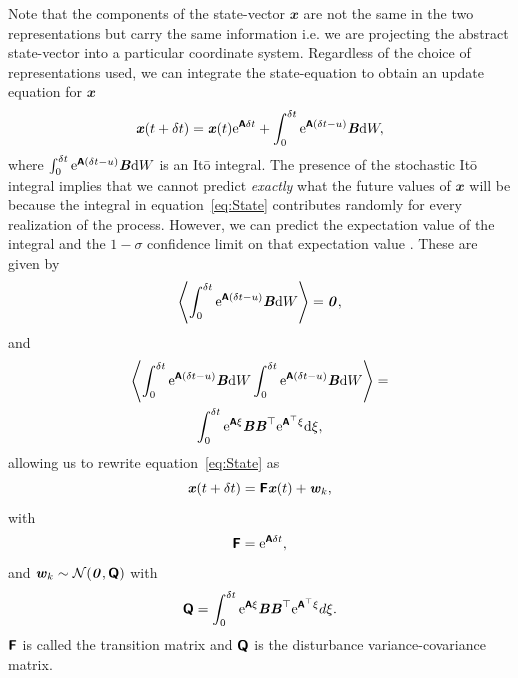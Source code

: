 \documentclass[a4paper,fleqn,usenatbib]{mnras}
\begin{document}
Note that the components of the state-vector $\mathbfit{x}$ are not the same in the two representations but carry the same information i.e. we are projecting the abstract state-vector into a particular coordinate system. Regardless of the choice of representations used, we can integrate the state-equation \citep{DimensionEstimationBrockwell,Oksendal} to obtain an update equation for $\mathbfit{x}$
\begin{equation}\label{eq:State}
\textbf{\textit{x}}(t + \delta t) = \textbf{\textit{x}}(t)\mathrm{e}^{\textbf{\textsf{A}}\delta t} + \int_{0}^{\delta t} \mathrm{e}^{\textbf{\textsf{A}}(\delta t-u)}\textbf{\textit{B}} \mathrm{d}W,
\end{equation}
where $\int_{0}^{\delta t} \mathrm{e}^{\textbf{\textsf{A}}(\delta t-u)}\textbf{\textit{B}} \mathrm{d}W$ is an It\={o} integral. The presence of the stochastic It\={o} integral implies that we cannot predict \textit{exactly} what the future values of $\mathbfit{x}$ will be because the integral in equation~\eqref{eq:State} contributes randomly for every realization of the process. However, we can predict the expectation value of the integral and the $1-\sigma$ confidence limit on that expectation value \citep[chapter 6]{Davis}. These are given by
\begin{equation}\label{eq:ExpVal}
\left\langle \int_{0}^{\delta t} \mathrm{e}^{\textbf{\textsf{A}}(\delta t-u)}\textbf{\textit{B}} \mathrm{d}W \right\rangle = \textbf{\textit{0}},
\end{equation}
and
\begin{multline}\label{eq:CovVal}
\left\langle \int_{0}^{\delta t} \mathrm{e}^{\textbf{\textsf{A}}(\delta t-u)}\textbf{\textit{B}} \mathrm{d}W \int_{0}^{\delta t} \mathrm{e}^{\textbf{\textsf{A}}(\delta t-u)}\textbf{\textit{B}} \mathrm{d}W \right\rangle = \\ \int_{0}^{\delta t} \mathrm{e}^{\textbf{\textsf{A}}\xi}\textbf{\textit{B}}\textbf{\textit{B}}^{\top}\mathrm{e}^{\textbf{\textsf{A}}^{\top}\xi} \mathrm{d}\xi,
\end{multline}
allowing us to rewrite equation~\ref{eq:State} as
\begin{equation}\label{eq:IntegratedState}
\textbf{\textit{x}}(t + \delta t) = \textbf{\textsf{F}}\textbf{\textit{x}}(t) + \textbf{\textit{w}}_{k},
\end{equation}
with \begin{equation}\label{eq:TransMat}
\textbf{\textsf{F}} = \mathrm{e}^{\textbf{\textsf{A}}\delta t},
\end{equation}
and $\textbf{\textit{w}}_{k} \sim \mathcal{N}(\textbf{\textit{0}},\textbf{\textsf{Q}})$ with 
\begin{equation}\label{eq:DistMat}
\textbf{\textsf{Q}} = \int_{0}^{\delta t} \mathrm{e}^{\textbf{\textsf{A}}\xi}\textbf{\textit{B}}\textbf{\textit{B}}^{\top}\mathrm{e}^{\textbf{\textsf{A}}^{\top}\xi} d\xi.
\end{equation}
$\textbf{\textsf{F}}$ is called the transition matrix and $\textbf{\textsf{Q}}$ is the disturbance variance-covariance matrix.
\end{document}
